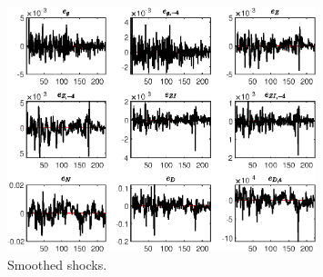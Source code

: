  
\begin{figure}[H]
\centering 
\includegraphics[width=0.80\textwidth]{BRS_sectoral_rest/graphs/BRS_sectoral_rest_SmoothedShocks1}
\caption{Smoothed shocks.}\label{Fig:SmoothedShocks:1}
\end{figure}


